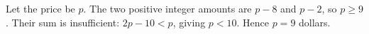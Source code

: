 Let the price be $p$. The two positive integer amounts are $p-8$ and $p-2$, so $p\ge9$. Their sum is insufficient: $2p-10<p$, giving $p<10$. Hence $\boxed{p=9}$ dollars.
